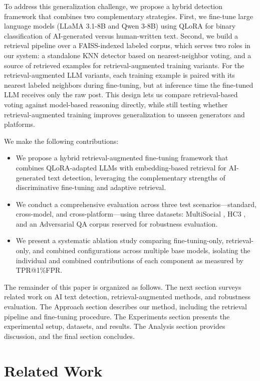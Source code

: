 \documentclass[letterpaper]{article} %
\begin{document}
To address this generalization challenge, we propose a hybrid detection framework that combines two complementary strategies. First, we fine-tune large language models (LLaMA 3.1-8B and Qwen 3-8B) using QLoRA \cite{dettmers2023qlora, hu2022lora} for binary classification of AI-generated versus human-written text. Second, we build a retrieval pipeline over a FAISS-indexed labeled corpus, which serves two roles in our system: a standalone KNN detector based on nearest-neighbor voting, and a source of retrieved examples for retrieval-augmented training variants. For the retrieval-augmented LLM variants, each training example is paired with its nearest labeled neighbors during fine-tuning, but at inference time the fine-tuned LLM receives only the raw post. This design lets us compare retrieval-based voting against model-based reasoning directly, while still testing whether retrieval-augmented training improves generalization to unseen generators and platforms.

We make the following contributions:
\begin{itemize}
    \item We propose a hybrid retrieval-augmented fine-tuning framework that combines QLoRA-adapted LLMs with embedding-based retrieval for AI-generated text detection, leveraging the complementary strengths of discriminative fine-tuning and adaptive retrieval.
    \item We conduct a comprehensive evaluation across three test scenarios---standard, cross-model, and cross-platform---using three datasets: MultiSocial \cite{multisocial2025}, HC3 \cite{guo2023hc3}, and an Adversarial QA corpus reserved for robustness evaluation.
    \item We present a systematic ablation study comparing fine-tuning-only, retrieval-only, and combined configurations across multiple base models, isolating the individual and combined contributions of each component as measured by TPR@1\%FPR.
\end{itemize}

The remainder of this paper is organized as follows. The next section surveys related work on AI text detection, retrieval-augmented methods, and robustness evaluation. The Approach section describes our method, including the retrieval pipeline and fine-tuning procedure. The Experiments section presents the experimental setup, datasets, and results. The Analysis section provides discussion, and the final section concludes.

\section{Related Work}
\end{document}
